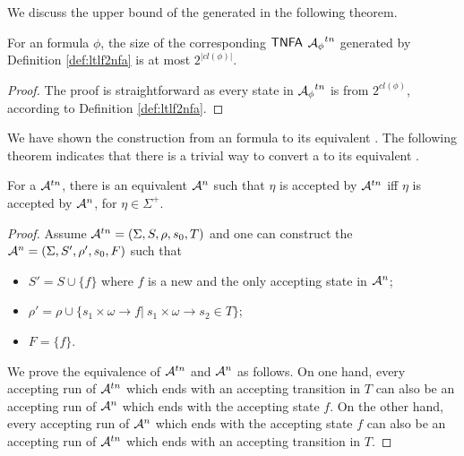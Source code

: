 We discuss the upper bound of the generated \TNFA in the following theorem.

\begin{theorem}\label{thm:tnfaBound}
For an \ltlf formula $\phi$, the size of the corresponding ${\sf TNFA}$ ${\mathcal{A}_{\phi}}^{tn}$ generated by Definition \ref{def:ltlf2nfa} is at most $2^{|cl(\phi)|}$.
\end{theorem}
\begin{proof}
	The proof is straightforward as every state in ${\mathcal{A}_{\phi}}^{tn}$ is from $2^{cl(\phi)}$, according to Definition \ref{def:ltlf2nfa}.
\end{proof}

We have shown the construction from an \ltlf formula to its equivalent \TNFA. The following theorem indicates that there is a trivial way to convert a \TNFA to its equivalent \NFA. 

\begin{theorem}\label{thm:tnfa2nfa}
For a \TNFA $\mathcal{A}^{tn}$, there is an equivalent \NFA $\mathcal{A}^n$ such that $\eta$ is accepted by $\mathcal{A}^{tn}$ iff $\eta$ is accepted by $\mathcal{A}^n$, for $\eta\in \Sigma^+$. 
\end{theorem}
\begin{proof}
Assume $\mathcal{A}^{tn}=(\Sigma, S, \rho, s_0, T)$ and one can construct the \NFA $\mathcal{A}^{n} = (\Sigma, S', \rho', s_0, F)$ such that 
\begin{itemize}
	\item $S' = S\cup \{f\}$ where $f$ is a new and the only accepting state in $\mathcal{A}^n$; 
	\item $\rho'=\rho\cup\{s_1\times\omega\to f|\ s_1\times\omega\to s_2\in T\}$;
	\item $F=\{f\}$.
\end{itemize}
We prove the equivalence of $\mathcal{A}^{tn}$ and $\mathcal{A}^n$ as follows. On one hand, every accepting run of $\mathcal{A}^{tn}$ which ends with an accepting transition in $T$ can also be an accepting run of $\mathcal{A}^n$ which ends with the accepting state $f$. On the other hand, every accepting run of $\mathcal{A}^{n}$ which ends with the accepting state $f$ can also be an accepting run of $\mathcal{A}^{tn}$ which ends with an accepting transition in $T$.
\end{proof}

